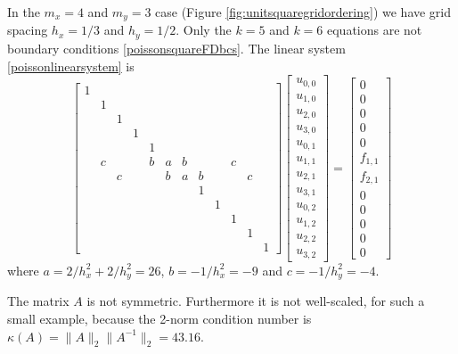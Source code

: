 \medskip\noindent\hrulefill
\begin{example} In the $m_x=4$ and $m_y=3$ case (Figure \ref{fig:unitsquaregridordering}) we have grid spacing $h_x=1/3$ and $h_y=1/2$.  Only the $k=5$ and $k=6$ equations are not boundary conditions \eqref{poissonsquareFDbcs}.  The linear system \eqref{poissonlinearsystem} is
\setcounter{MaxMatrixCols}{20}
\begin{equation*}
\begin{bmatrix}
1 &  &  &  &  &  &  &  &  &  &  &  \\
  & 1&  &  &  &  &  &  &  &  &  &  \\
  &  & 1&  &  &  &  &  &  &  &  &  \\
  &  &  & 1&  &  &  &  &  &  &  &  \\
  &  &  &  & 1&  &  &  &  &  &  &  \\
  & c&  &  & b& a& b&  &  & c&  &  \\
  &  & c&  &  & b& a& b&  &  & c&  \\
  &  &  &  &  &  &  & 1&  &  &  &  \\
  &  &  &  &  &  &  &  & 1&  &  &  \\
  &  &  &  &  &  &  &  &  & 1&  &  \\
  &  &  &  &  &  &  &  &  &  & 1&  \\
  &  &  &  &  &  &  &  &  &  &  & 1
\end{bmatrix}
\begin{bmatrix}
u_{0,0} \\
u_{1,0} \\
u_{2,0} \\
u_{3,0} \\
u_{0,1} \\
u_{1,1} \\
u_{2,1} \\
u_{3,1} \\
u_{0,2} \\
u_{1,2} \\
u_{2,2} \\
u_{3,2}
\end{bmatrix}
=
\begin{bmatrix}
0 \\
0 \\
0 \\
0 \\
0 \\
f_{1,1} \\
f_{2,1} \\
0 \\
0 \\
0 \\
0 \\
0
\end{bmatrix}
\end{equation*}
where $a = 2/h_x^2 + 2/h_y^2 = 26$, $b = - 1/h_x^2 = -9$ and $c = - 1/h_y^2 = -4$.

The matrix $A$ is not symmetric.  Furthermore it is not well-scaled, for such a small example, because the 2-norm condition number is $\kappa(A) = \|A\|_2 \|A^{-1}\|_2 = 43.16$.

\noindent\hrulefill
\end{example}

